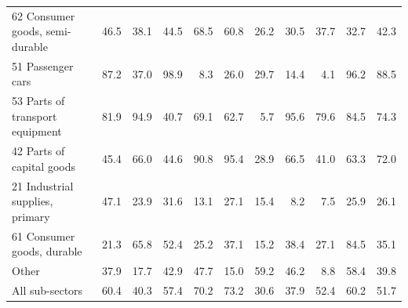 \begin{tabular}{lrrrrrrrrrr}
62 Consumer goods, semi-durable & 46.5 & 38.1 & 44.5 & 68.5 & 60.8 & 26.2 & 30.5 & 37.7 & 32.7 & 42.3 \\
51 Passenger cars & 87.2 & 37.0 & 98.9 & 8.3 & 26.0 & 29.7 & 14.4 & 4.1 & 96.2 & 88.5 \\
53 Parts of transport equipment & 81.9 & 94.9 & 40.7 & 69.1 & 62.7 & 5.7 & 95.6 & 79.6 & 84.5 & 74.3 \\
42 Parts of capital goods & 45.4 & 66.0 & 44.6 & 90.8 & 95.4 & 28.9 & 66.5 & 41.0 & 63.3 & 72.0 \\
21 Industrial supplies, primary & 47.1 & 23.9 & 31.6 & 13.1 & 27.1 & 15.4 & 8.2 & 7.5 & 25.9 & 26.1 \\
61 Consumer goods, durable & 21.3 & 65.8 & 52.4 & 25.2 & 37.1 & 15.2 & 38.4 & 27.1 & 84.5 & 35.1 \\
Other & 37.9 & 17.7 & 42.9 & 47.7 & 15.0 & 59.2 & 46.2 & 8.8 & 58.4 & 39.8 \\
All sub-sectors & 60.4 & 40.3 & 57.4 & 70.2 & 73.2 & 30.6 & 37.9 & 52.4 & 60.2 & 51.7 \\
\bottomrule
\end{tabular}
